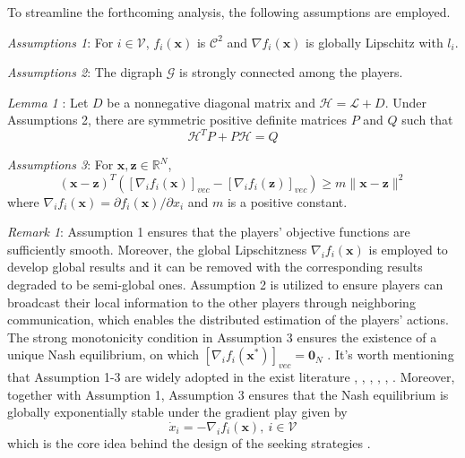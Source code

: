 \documentclass[lettersize,journal]{IEEEtran}
\begin{document}
To streamline the forthcoming analysis, the following assumptions are employed.

\emph{Assumptions 1}: For $i \in \mathcal{V}$, $f_i(\mathbf{x})$ is $\mathcal{C}^2$ and $\nabla f_i(\mathbf{x})$ is globally Lipschitz with $l_i$.

\emph{Assumptions 2}: The digraph $\mathcal{G}$ is strongly connected among the players.

\emph{Lemma 1} \cite{lewis2013cooperative}: Let $D$ be a nonnegative diagonal matrix and $\mathcal{H} = \mathcal{L} + D$. Under Assumptions 2, there are symmetric positive definite matrices $P$ and $Q$ such that
\begin{equation}
    \mathcal{H}^{T}P+P\mathcal{H}=Q
\end{equation}

\emph{Assumptions 3}: For $\mathbf{x}, \mathbf{z} \in \mathbb{R}^N$,
\begin{equation}
    (\mathbf{x}-\mathbf{z})^T([\nabla_if_i(\mathbf{x})]_{vec}-[\nabla_if_i(\mathbf{z})]_{vec})\geq m\|\mathbf{x}-\mathbf{z}\|^2
\end{equation}
where $\nabla_{i}f_{i}(\mathbf{x})=\partial f_{i}(\mathbf{x})/\partial x_{i}$ and $m$ is a positive constant.

\emph{Remark 1}: Assumption 1 ensures that the players' objective functions are sufficiently smooth. Moreover, the global Lipschitzness $\nabla_if_i(\mathbf{x})$ is employed to develop global results and it can be removed with the corresponding results degraded to be semi-global ones. Assumption 2 is utilized to ensure players can broadcast their local information to the other players through neighboring communication, which enables the distributed estimation of the players' actions. The strong monotonicity condition in Assumption 3 ensures the existence of a unique Nash equilibrium, on which $[\nabla_if_i(\mathbf{x}^*)]_{vec} = \mathbf{0}_N$ \cite{ye2020distributed}.
It's worth mentioning that Assumption 1-3 are widely adopted in the exist literature \cite{8093754}, \cite{ye2021adaptive}, \cite{9696299}, \cite{ye2020distributed}, \cite{li2021distributed}, \cite{8985536}.
Moreover, together with Assumption 1, Assumption 3 ensures that the Nash equilibrium is globally exponentially stable under the gradient play given by
\begin{equation}
    \dot{x}_i=-\nabla_if_i(\mathbf{x}),~ i \in \mathcal{V}
\end{equation}
which is the core idea behind the design of the seeking strategies \cite{7888532}.
\end{document}

